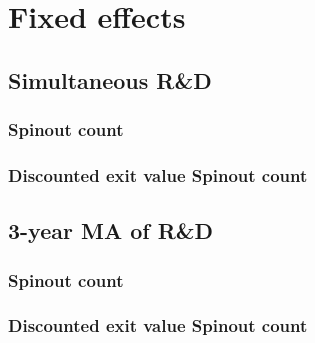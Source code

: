 \documentclass[12pt,english]{article}
\theoremstyle{remark}
\begin{document}


\section{Fixed effects}

\subsection{Simultaneous R\&D}

\subsubsection{Spinout count}


\linebreak

\linebreak



\subsubsection{Discounted exit value Spinout count}

\linebreak

\linebreak


\subsection{3-year MA of R\&D}

\subsubsection{Spinout count}


\linebreak

\linebreak



\subsubsection{Discounted exit value Spinout count}


\linebreak

\linebreak

\end{document}
